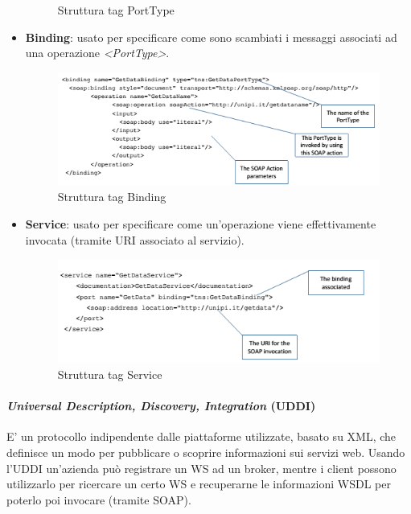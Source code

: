 \documentclass{article}
\begin{document}
\begin{itemize}
\begin{figure}[H]
        \caption{Struttura tag PortType}
        \end{figure}
    \item \textbf{Binding}: usato per specificare come sono scambiati i messaggi associati ad una operazione \textit{<PortType>}.
        \begin{figure}[H]
        \centering
        \includegraphics[scale=0.8]{img/wsdlBinding.png}
        \caption{Struttura tag Binding}
        \end{figure}
    \item \textbf{Service}: usato per specificare come un'operazione viene effettivamente invocata (tramite URI associato al servizio).
        \begin{figure}[H]
        \centering
        \includegraphics[scale=0.8]{img/wsdlServiceField.png}
        \caption{Struttura tag Service}
        \end{figure}
\end{itemize}

\paragraph{\textit{Universal Description, Discovery, Integration} (UDDI)} 
E' un protocollo indipendente dalle piattaforme utilizzate, basato su XML, che definisce un modo per pubblicare o scoprire informazioni sui servizi web. Usando l'UDDI un'azienda può registrare un WS ad un broker, mentre i client possono utilizzarlo per ricercare un certo WS e recuperarne le informazioni WSDL per poterlo poi invocare (tramite SOAP).
\end{document}
